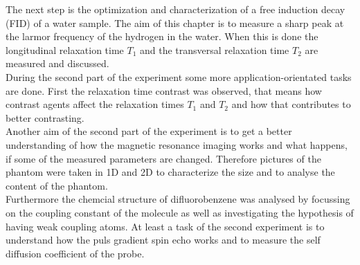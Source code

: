 The next step is the optimization and characterization of a free induction decay (FID) of a water sample.
The aim of this chapter is to measure a sharp peak at the larmor frequency of the hydrogen in the water.
When this is done the longitudinal relaxation time $T_1$ and the transversal relaxation time $T_2$ are measured and discussed.\\
During the second part of the experiment some more application-orientated tasks are done.
First the relaxation time contrast was observed, that means how contrast agents affect the relaxation times $T_1$ and $T_2$ and how that contributes to better contrasting.\\
Another aim of the second part of the experiment is to get a better understanding of how
the magnetic resonance imaging works and what happens, if some of the measured parameters are changed. Therefore pictures of the phantom were taken in 1D and 2D to characterize the size and to analyse the content of the phantom.\\
Furthermore the chemcial structure of difluorobenzene was analysed by focussing on the coupling constant of the molecule as well as investigating the hypothesis of having weak coupling atoms.
At least a task of the second experiment is to understand how the puls gradient spin echo works and to measure the self diffusion coefficient of the probe.
